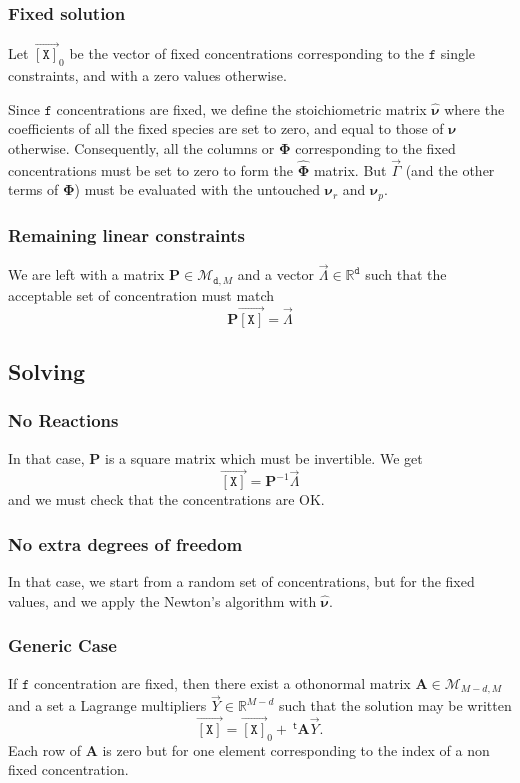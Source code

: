 \documentclass[aps,onecolumn]{revtex4}
\newcommand{\myconc}[1]{\left\lbrack #1 \right\rbrack}
\newcommand{\mychem}[1]{{\mathtt{#1}}}
\newcommand{\mymat}[1]{\boldsymbol{#1}}
\newcommand{\mytrn}[1]{{\!\!~^{\mathsf{t}}{#1}}}
\newcommand{\myvec}[1]{\overrightarrow{#1}}
\newcommand{\vecX}{\myvec{\myconc{\mychem{X}}}}
\newcommand{\dof}{\mathtt{d}}
\newcommand{\fixed}{\mathtt{f}}
\begin{document}
\subsubsection{Fixed solution}
Let $\vecX_0$ be the vector of fixed concentrations corresponding to the $\fixed$ single constraints, and with
a zero values otherwise.
	
Since $\fixed$ concentrations are fixed, we define the stoichiometric matrix $\hat{\mymat{\nu}}$
where the coefficients of all the fixed species are set to zero, and equal to those of $\mymat{\nu}$ otherwise.
Consequently, all the columns or $\mymat{\Phi}$ corresponding to the fixed concentrations must 
be set to zero to form the $\hat{\mymat{\Phi}}$ matrix. 
But $\vec{\Gamma}$ (and the other terms of $\mymat{\Phi}$) must be evaluated with
the untouched $\mymat{\nu}_r$ and $\mymat{\nu}_p$.

\subsubsection{Remaining linear constraints}
We are left with a matrix $\mymat{P}\in\mathcal{M}_{\dof,M}$ and a vector $\vec{\Lambda}\in\mathbb{R}^{\dof}$ such
that the acceptable set of concentration must match
\begin{equation}
	\mymat{P}\vecX = \vec{\Lambda}
\end{equation}

\subsection{Solving}
\subsubsection{No Reactions}
In that case, $\mymat{P}$ is a square matrix which must be invertible.
We get
$$
	\vecX = \mymat{P}^{-1}\vec{\Lambda}
$$
and we must check that the concentrations are OK.

\subsubsection{No extra degrees of freedom}
In that case, we start from a random set of concentrations, but for the fixed values, and
we apply the Newton's algorithm with $\hat{\mymat{\nu}}$.

\subsubsection{Generic Case}
If $\fixed$ concentration are fixed, then there exist a othonormal matrix $\mymat{A}\in\mathcal{M}_{M-d,M}$ and
a set a Lagrange multipliers $\vec{Y}\in\mathbb{R}^{M-d}$ such that the solution may be written
\begin{equation}
	\vecX = \vecX_0 + \mytrn{\mymat{A}} \vec{Y}.
\end{equation}
Each row of $\mymat{A}$ is zero but for one element corresponding to the index of a non fixed concentration.
\end{document}
